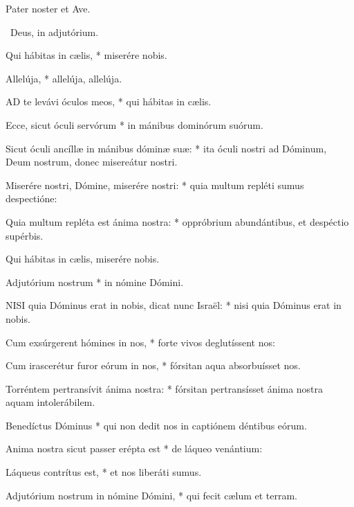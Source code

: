 

Pater noster et Ave.

\V\ Deus, in adjutórium.


 Qui hábitas in cælis, * miserére nobis.


 Allelúja, * allelúja, allelúja.


\lettrine[lines=2]{A}{D} te levávi óculos meos, * qui hábitas in cælis.

Ecce, sicut óculi servórum * in mánibus dominórum suórum.

Sicut óculi ancíllæ in mánibus dóminæ suæ: * ita óculi nostri ad Dóminum, Deum nostrum, donec misereátur nostri.

Miserére nostri, Dómine, miserére nostri: * quia multum repléti sumus despectióne:

Quia multum repléta est ánima nostra: * oppróbrium abundántibus, et despéctio supérbis.

 Qui hábitas in cælis, miserére nobis.

 Adjutórium nostrum * in nómine Dómini.


\lettrine[lines=2]{N}{ISI} quia Dóminus erat in nobis, dicat nunc Israël: * nisi quia Dóminus erat in nobis.

Cum exsúrgerent hómines in nos, * forte vivos deglutíssent nos:

Cum irascerétur furor eórum in nos, * fórsitan aqua absorbuísset nos.

Torréntem pertransívit ánima nostra: * fórsitan pertransísset ánima nostra aquam intolerábilem.

Benedíctus Dóminus * qui non dedit nos in captiónem déntibus eórum.

Anima nostra sicut passer erépta est * de láqueo venántium:

Láqueus contrítus est, * et nos liberáti sumus.

Adjutórium nostrum in nómine Dómini, * qui fecit cælum et terram.

